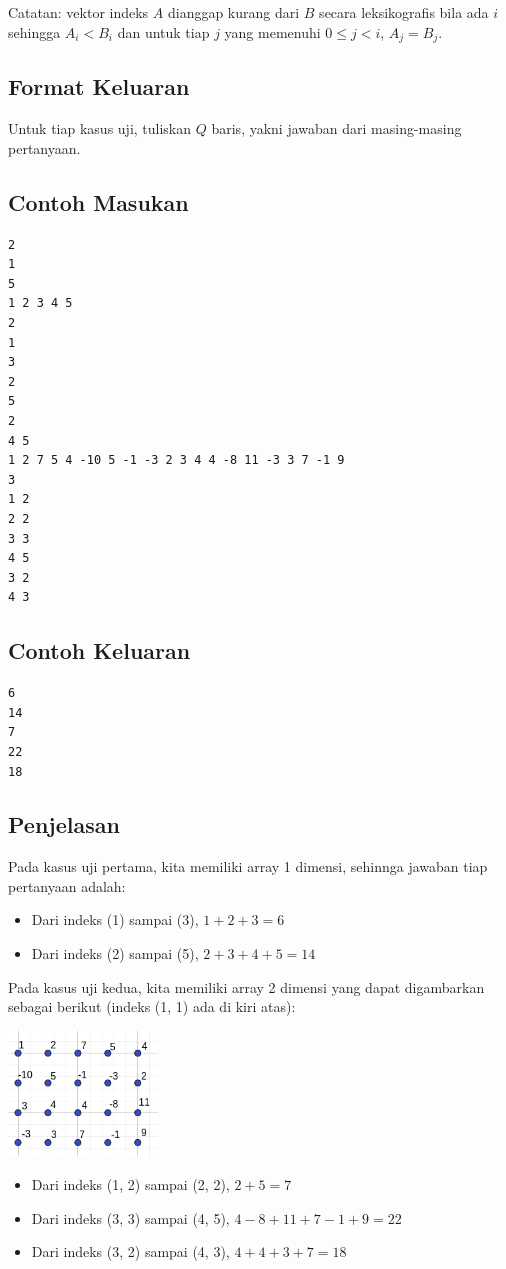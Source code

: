 \documentclass{article}
\begin{document}
Catatan: vektor indeks $A$ dianggap kurang dari $B$ secara leksikografis bila ada $i$ sehingga $A_i < B_i$ dan untuk tiap $j$ yang memenuhi $0 \leq j < i$, $A_j = B_j$.

\subsection*{Format Keluaran}

Untuk tiap kasus uji, tuliskan $Q$ baris, yakni jawaban dari masing-masing pertanyaan.

\pagebreak

\begin{multicols}{2}
\subsection*{Contoh Masukan}
\begin{lstlisting}
2
1
5
1 2 3 4 5
2
1
3
2
5
2
4 5
1 2 7 5 4 -10 5 -1 -3 2 3 4 4 -8 11 -3 3 7 -1 9
3
1 2
2 2
3 3
4 5
3 2
4 3
\end{lstlisting}
\columnbreak
\subsection*{Contoh Keluaran}
\begin{lstlisting}
6
14
7
22
18
\end{lstlisting}
\vfill
\null
\end{multicols}

\subsection*{Penjelasan}
Pada kasus uji pertama, kita memiliki array 1 dimensi, sehinnga jawaban tiap pertanyaan adalah:
\begin{itemize}
    \item Dari indeks (1) sampai (3), $1 + 2 + 3 = 6$
    \item Dari indeks (2) sampai (5), $2 + 3 + 4 + 5 = 14$
\end{itemize}

Pada kasus uji kedua, kita memiliki array 2 dimensi yang dapat digambarkan sebagai berikut (indeks (1, 1) ada di kiri atas):

\includegraphics[width=150px]{sample-2}

\begin{itemize}
    \item Dari indeks (1, 2) sampai (2, 2), $2 + 5 = 7$
    \item Dari indeks (3, 3) sampai (4, 5), $4 - 8 + 11 + 7 - 1 + 9 = 22$
    \item Dari indeks (3, 2) sampai (4, 3), $4 + 4 + 3 + 7 = 18$
\end{itemize}

\pagebreak
\end{document}
